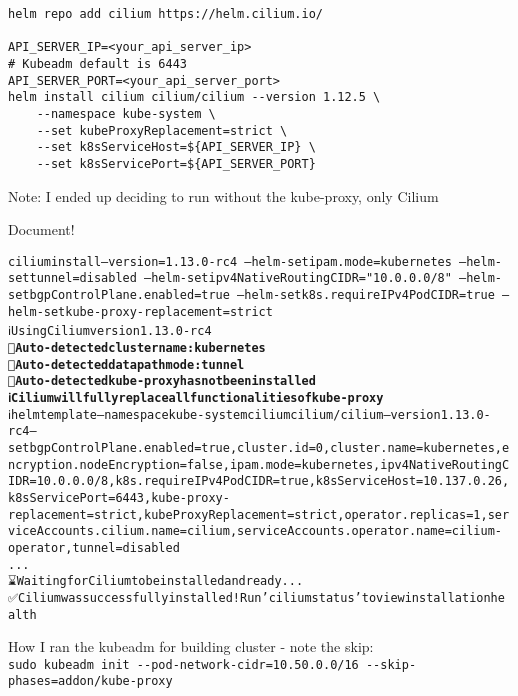 \documentclass[Screen16to9,17pt]{foils}
\begin{document}
\begin{verbatim}
helm repo add cilium https://helm.cilium.io/

API_SERVER_IP=<your_api_server_ip>
# Kubeadm default is 6443
API_SERVER_PORT=<your_api_server_port>
helm install cilium cilium/cilium --version 1.12.5 \
    --namespace kube-system \
    --set kubeProxyReplacement=strict \
    --set k8sServiceHost=${API_SERVER_IP} \
    --set k8sServicePort=${API_SERVER_PORT}
\end{verbatim}

\begin{list2}
\item Note: I ended up deciding to run without the kube-proxy, only Cilium
\item Document!
\end{list2}




\begin{alltt}\footnotesize
cilium install --version=1.13.0-rc4 \
		--helm-set ipam.mode=kubernetes \
		--helm-set tunnel=disabled \
		--helm-set ipv4NativeRoutingCIDR="10.0.0.0/8" \
		--helm-set bgpControlPlane.enabled=true \
		--helm-set k8s.requireIPv4PodCIDR=true  \
		--helm-set kube-proxy-replacement=strict
ℹ️  Using Cilium version 1.13.0-rc4{\bf
🔮 Auto-detected cluster name: kubernetes
🔮 Auto-detected datapath mode: tunnel
🔮 Auto-detected kube-proxy has not been installed
ℹ️  Cilium will fully replace all functionalities of kube-proxy}
ℹ️  helm template --namespace kube-system cilium cilium/cilium --version 1.13.0-rc4 --set bgpControlPlane.enabled=true,cluster.id=0,cluster.name=kubernetes,encryption.nodeEncryption=false,ipam.mode=kubernetes,ipv4NativeRoutingCIDR=10.0.0.0/8,k8s.requireIPv4PodCIDR=true,k8sServiceHost=10.137.0.26,k8sServicePort=6443,kube-proxy-replacement=strict,kubeProxyReplacement=strict,operator.replicas=1,serviceAccounts.cilium.name=cilium,serviceAccounts.operator.name=cilium-operator,tunnel=disabled
...
⌛ Waiting for Cilium to be installed and ready...
✅ Cilium was successfully installed! Run 'cilium status' to view installation health
\end{alltt}


How I ran the kubeadm for building cluster - note the skip:\\
\verb+sudo kubeadm init --pod-network-cidr=10.50.0.0/16 --skip-phases=addon/kube-proxy+

\slide{After install Cilium}
\end{document}
